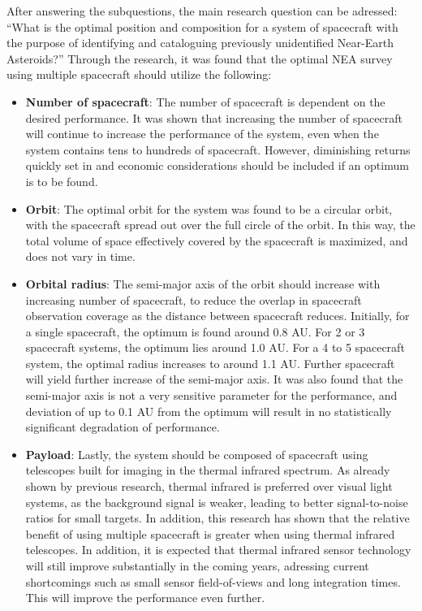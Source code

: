 After answering the subquestions, the main research question can be adressed: ``What is the optimal position and composition for a system of spacecraft with the purpose of identifying and cataloguing previously unidentified Near-Earth Asteroids?'' Through the research, it was found that the optimal NEA survey using multiple spacecraft should utilize the following:
\begin{itemize}
 \item \textbf{Number of spacecraft}: The number of spacecraft is dependent on the desired performance. It was shown that increasing the number of spacecraft will continue to increase the performance of the system, even when the system contains tens to hundreds of spacecraft. However, diminishing returns quickly set in and economic considerations should be included if an optimum is to be found.
 \item \textbf{Orbit}: The optimal orbit for the system was found to be a circular orbit, with the spacecraft spread out over the full circle of the orbit. In this way, the total volume of space effectively covered by the spacecraft is maximized, and does not vary in time.
 \item \textbf{Orbital radius}: The semi-major axis of the orbit should increase with increasing number of spacecraft, to reduce the overlap in spacecraft observation coverage as the distance between spacecraft reduces. Initially, for a single spacecraft, the optimum is found around 0.8 AU. For 2 or 3 spacecraft systems, the optimum lies around 1.0 AU. For a 4 to 5 spacecraft system, the optimal radius increases to around 1.1 AU. Further spacecraft will yield further increase of the semi-major axis. It was also found that the semi-major axis is not a very sensitive parameter for the performance, and deviation of up to 0.1 AU from the optimum will result in no statistically significant degradation of performance.
 \item \textbf{Payload}: Lastly, the system should be composed of spacecraft using telescopes built for imaging in the thermal infrared spectrum. As already shown by previous research, thermal infrared is preferred over visual light systems, as the background signal is weaker, leading to better signal-to-noise ratios for small targets. In addition, this research has shown that the relative benefit of using multiple spacecraft is greater when using thermal infrared telescopes. In addition, it is expected that thermal infrared sensor technology will still improve substantially in the coming years, adressing current shortcomings such as small sensor field-of-views and long integration times. This will improve the performance even further.
\end{itemize}

